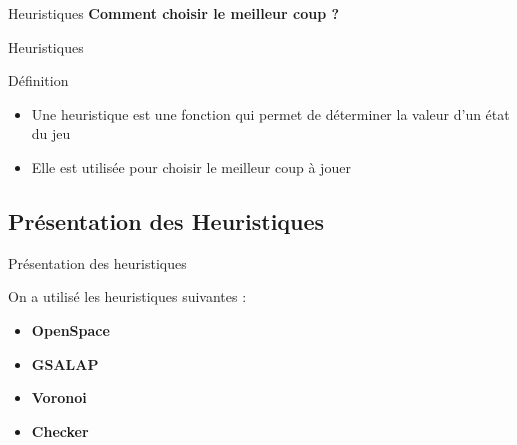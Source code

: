 \begin{frame}{Heuristiques}
    \centering
    \Large \textbf{Comment choisir le meilleur coup ?}
\end{frame}

\begin{frame}{Heuristiques}
    \begin{block}{Définition}
        \begin{itemize}
            \item Une heuristique est une fonction qui permet de déterminer la valeur d'un état du jeu
            \item Elle est utilisée pour choisir le meilleur coup à jouer
        \end{itemize}
    \end{block}
\end{frame}

\subsection*{Présentation des Heuristiques}
    \begin{frame}{Présentation des heuristiques}
        \begin{block}{On a utilisé les heuristiques suivantes :}
            \begin{itemize}
                \item \textbf{OpenSpace}
                \item \textbf{GSALAP}
                \item \textbf{Voronoi}
                \item \textbf{Checker}
            \end{itemize}
        \end{block}
    \end{frame}

